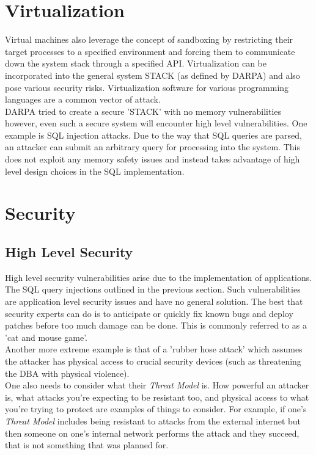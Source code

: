 \documentclass[twoside]{article}
\begin{document}
\section{Virtualization}
Virtual machines also leverage the concept of sandboxing by restricting their target processes to a specified environment and forcing them to communicate down the system stack through a specified API. Virtualization can be incorporated into the general system STACK (as defined by DARPA) and also pose various security risks. Virtualization software for various programming languages are a common vector of attack. \\
DARPA tried to create a secure 'STACK' with no memory vulnerabilities however, even such a secure system will encounter high level vulnerabilities. One example is SQL injection attacks. Due to the way that SQL queries are parsed, an attacker can submit an arbitrary query for processing into the system. This does not exploit any memory safety issues and instead takes advantage of high level design choices in the SQL implementation. \\

\section{Security}
\subsection{High Level Security}
High level security vulnerabilities arise due to the implementation of applications. The SQL query injections outlined in the previous section. Such vulnerabilities are application level security issues and have no general solution. The best that security experts can do is to anticipate or quickly fix known bugs and deploy patches before too much damage can be done. This is commonly referred to as a 'cat and mouse game'. \\
Another more extreme example is that of a 'rubber hose attack' which assumes the attacker has physical access to crucial security devices (such as threatening the DBA with physical violence). \\
One also needs to consider what their \textit{Threat Model} is. How powerful an attacker is, what attacks you're expecting to be resistant too, and physical access to what you're trying to protect are examples of things to consider. For example, if one's \textit{Threat Model} includes being resistant to attacks from the external internet but then someone on one's internal network performs the attack and they succeed, that is not something that was planned for.
\end{document}
